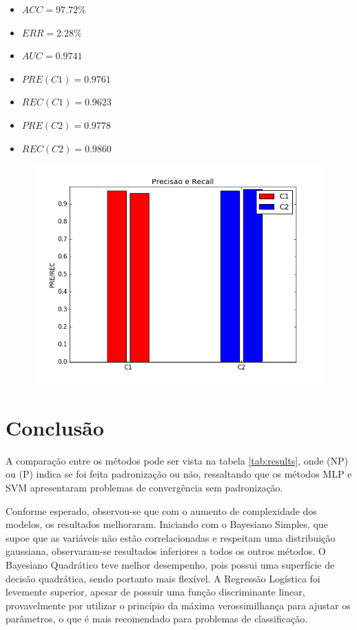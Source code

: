 \documentclass[11pt,a4paper]{article}
\numberwithin{equation}{section}
\begin{document}
\begin{minipage}{.5\textwidth}
\begin{itemize}
\item $ACC = 97.72 \%$
\item $ERR =  2.28 \%$
\item $AUC = 0.9741  $
\item $PRE(C1) = 0.9761$
\item $REC(C1) = 0.9623$
\item $PRE(C2) = 0.9778$
\item $REC(C2) = 0.9860$
\end{itemize}
\end{minipage}%
\begin{minipage}{.5\textwidth}
\begin{figure}[H]
\centering
  \includegraphics[width=\linewidth]{../img/svm.png}
  \label{fig:percep}
\end{figure}
\end{minipage}%

\section{Conclusão}
A comparação entre os métodos pode ser vista na tabela \ref{tab:results}, onde (NP) ou (P) indica se foi feita padronização ou não, ressaltando que os métodos MLP e SVM apresentaram problemas de convergência sem padronização.

Conforme esperado, observou-se que com o aumento de complexidade dos modelos, os resultados melhoraram. Iniciando com o Bayesiano Simples, que supoe que as variáveis não estão correlacionadas e respeitam uma distribuição gaussiana, observaram-se resultados inferiores a todos os outros métodos. O Bayesiano Quadrático teve melhor desempenho, pois possui uma superfície de decisão quadrática, sendo portanto mais flexível. A Regressão Logística foi levemente superior, apesar de possuir uma função discriminante linear, provavelmente por utilizar o princípio da máxima verossimilhança para ajustar os parâmetros, o que é mais recomendado para problemas de classificação. 
\end{document}
